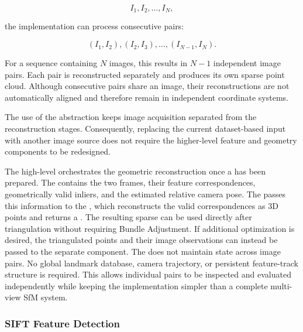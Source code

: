 \begin{equation}
I_1, I_2, \ldots, I_N,
\end{equation}

the implementation can process consecutive pairs:

\begin{equation}
(I_1,I_2),
(I_2,I_3),
\ldots,
(I_{N-1},I_N).
\end{equation}

For a sequence containing $N$ images, this results in $N-1$ independent
image pairs. Each pair is reconstructed separately and produces its own
sparse point cloud. Although consecutive pairs share an image, their
reconstructions are not automatically aligned and therefore remain in
independent coordinate systems.

The use of the  abstraction keeps image acquisition separated
from the reconstruction stages. Consequently, replacing the current
dataset-based input with another image source does not require the
higher-level feature and geometry components to be redesigned.

The high-level  orchestrates the geometric reconstruction
once a  has been prepared. The  contains
the two frames, their feature correspondences, geometrically valid inliers,
and the estimated relative camera pose. The  passes this
information to the , which reconstructs the valid
correspondences as 3D points and returns a .
The resulting sparse  can be used directly after
triangulation without requiring Bundle Adjustment. If additional
optimization is desired, the triangulated points and their image
observations can instead be passed to the separate
 component.
The  does not maintain state across image pairs. No
global landmark database, camera trajectory, or persistent feature-track
structure is required. This allows individual pairs to be inspected and
evaluated independently while keeping the implementation simpler than a
complete multi-view SfM system.


\subsubsection{SIFT Feature Detection}

